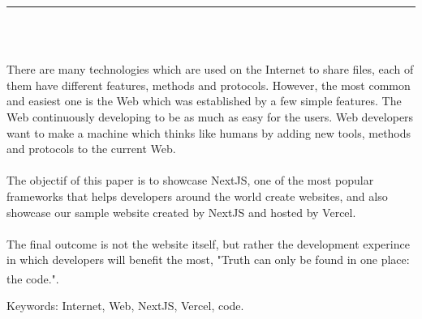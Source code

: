 \documentclass[12pt]{report}
\newenvironment{changemargin}[2]{%
\begin{list}{}{%
\setlength{\topsep}{0pt}%
\setlength{\leftmargin}{#1}%
\setlength{\rightmargin}{#2}%
\setlength{\listparindent}{\parindent}%
\setlength{\itemindent}{\parindent}%
\setlength{\parsep}{\parskip}%
}%
\item[]}{\end{list}}
\begin{document}
\begin{center}
    {\color{Blue} \rule{3in}{1.4mm} }\\
    \vspace{0.1in}
    \scshape{\fontsize{34}{46}{\bfseries{\color{Blue}{Abstract}}}}
    \\
    \vspace{0.6in}
\end{center}
\begin{changemargin}{0.9cm}{0.9cm}
\hspace*{0.16in}
There are many technologies which are used on the Internet to share files, each of them have different features, methods and protocols. However, the most common and easiest one is the Web which was established by a few simple features. The Web continuously developing to be as much as easy for the users. Web developers want to make a machine which thinks like humans by adding new tools, methods and protocols to the current Web.
\\\\
\hspace*{0.16in}
The objectif of this paper is to showcase NextJS, one of the most popular frameworks that helps developers around the world create websites, and also showcase our sample website created by NextJS and hosted by Vercel.
\\\\
\hspace*{0.16in}
The final outcome is not the website itself, but rather the development experince in which developers will benefit the most, "Truth can only be found in one place: the code.". \textsuperscript{\cite{martin2018clean}}
\end{changemargin}

\vspace{1in}

\begin{changemargin}{0.9cm}{0.9cm}
Keywords: Internet, Web, NextJS, Vercel, code.
\end{changemargin}

\newpage

\tableofcontents

\newpage

\listoffigures
\end{document}
